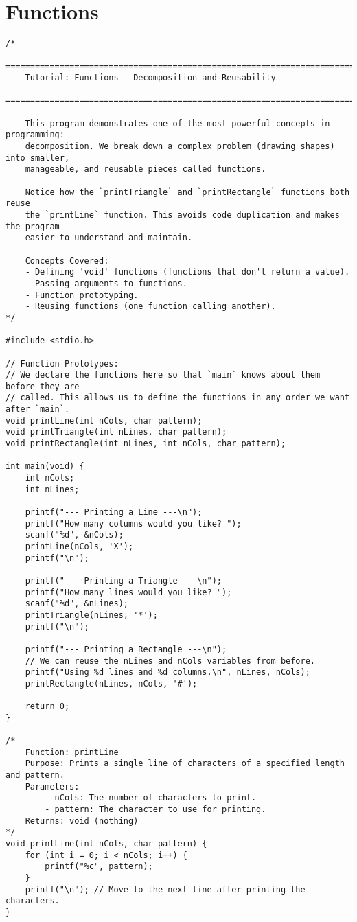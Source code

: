 \documentclass[11pt]{book}
\begin{document}
\chapter{Functions}
\clearpage
\begin{verbatim}
/*
    ================================================================================
    Tutorial: Functions - Decomposition and Reusability
    ================================================================================

    This program demonstrates one of the most powerful concepts in programming:
    decomposition. We break down a complex problem (drawing shapes) into smaller,
    manageable, and reusable pieces called functions.

    Notice how the `printTriangle` and `printRectangle` functions both reuse
    the `printLine` function. This avoids code duplication and makes the program
    easier to understand and maintain.

    Concepts Covered:
    - Defining 'void' functions (functions that don't return a value).
    - Passing arguments to functions.
    - Function prototyping.
    - Reusing functions (one function calling another).
*/

#include <stdio.h>

// Function Prototypes:
// We declare the functions here so that `main` knows about them before they are
// called. This allows us to define the functions in any order we want after `main`.
void printLine(int nCols, char pattern);
void printTriangle(int nLines, char pattern);
void printRectangle(int nLines, int nCols, char pattern);

int main(void) {
    int nCols;
    int nLines;

    printf("--- Printing a Line ---\n");
    printf("How many columns would you like? ");
    scanf("%d", &nCols);
    printLine(nCols, 'X');
    printf("\n");

    printf("--- Printing a Triangle ---\n");
    printf("How many lines would you like? ");
    scanf("%d", &nLines);
    printTriangle(nLines, '*');
    printf("\n");

    printf("--- Printing a Rectangle ---\n");
    // We can reuse the nLines and nCols variables from before.
    printf("Using %d lines and %d columns.\n", nLines, nCols);
    printRectangle(nLines, nCols, '#');

    return 0;
}

/*
    Function: printLine
    Purpose: Prints a single line of characters of a specified length and pattern.
    Parameters:
        - nCols: The number of characters to print.
        - pattern: The character to use for printing.
    Returns: void (nothing)
*/
void printLine(int nCols, char pattern) {
    for (int i = 0; i < nCols; i++) {
        printf("%c", pattern);
    }
    printf("\n"); // Move to the next line after printing the characters.
}


\end{verbatim}
\end{document}
